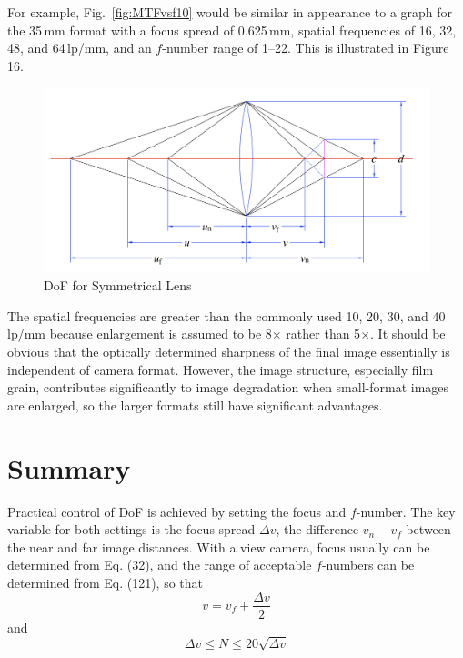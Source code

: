 \documentclass[11pt, oneside]{scrartcl}   	%
\newcommand{\Dv}{\ensuremath{\Delta v}}
\begin{document}
For example, Fig.~\ref{fig:MTFvsf10} would be similar in appearance to a graph for the 35\,mm format with a focus spread of 0.625\,mm, spatial frequencies of 16, 32, 48, and 64\,lp/mm, and an $f$-number range of 1--22. This is illustrated in Figure 16.

\begin{figure}[htbp] %
   \centering
   \includegraphics[width=\linewidth]{figure/fig_dofd_1} 
   \caption{DoF for Symmetrical Lens}
   \label{fig:symlens}
\end{figure}

The spatial frequencies are greater than the commonly used 10, 20, 30, and 40\,lp/mm because enlargement is assumed to be 8$\times$ rather than 5$\times$.
It should be obvious that the optically determined sharpness of the final image essentially is independent of camera format. However, the image structure, especially film grain, contributes significantly to image degradation when small-format images are enlarged, so the larger formats still have significant advantages.

\section{Summary}

Practical control of DoF is achieved by setting the focus and $f$-number. The key variable for both settings is the focus spread $\Dv$, the difference $v_n - v_f$ between the near and far image distances. With a view camera, focus usually can be determined from Eq. (32), and the range of acceptable $f$-numbers can be determined from Eq. (121), so that
\begin{equation}
v = v_f +\frac{\Dv}2
\end{equation}
and
\begin{equation}
\Dv \leq N \leq 20\sqrt{\Dv}
\end{equation}
\end{document}
